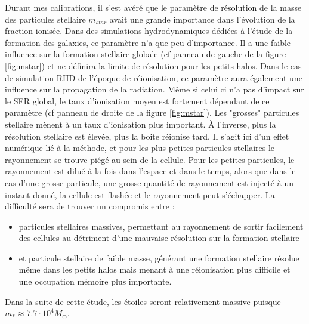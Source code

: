 Durant mes calibrations, il s'est avéré que le paramètre de résolution de la masse des particules stellaire $m_{star}$ avait une grande importance dans l'évolution de la fraction ionisée.
Dans des simulations hydrodynamiques dédiées à l'étude de la formation des galaxies, ce paramètre n'a que peu d'importance.
Il a une faible influence sur la formation stellaire globale (cf panneau de gauche de la figure \ref{fig:mstar}) et ne définira la limite de résolution pour les petits halos.
Dans le cas de simulation \ac{RHD} de l'époque de réionisation, ce paramètre aura également une influence sur la propagation de la radiation.
Même si celui ci n'a pas d'impact sur le \ac{SFR} global, le taux d'ionisation moyen est fortement dépendant de ce paramètre (cf panneau de droite de la figure \ref{fig:mstar}).
Les "grosses" particules stellaire mènent à un taux d'ionisation plus important.
À l'inverse, plus la résolution stellaire est élevée, plus la boite réionise tard.
Il s'agit ici d'un effet numérique lié à la méthode, et pour les plus petites particules stellaires le rayonnement se trouve piégé au sein de la cellule.
Pour les petites particules, le rayonnement est dilué à la fois dans l'espace et dans le temps, alors que dans le cas d'une grosse particule, une grosse quantité de rayonnement est injecté à un instant donné, la cellule est flashée et le rayonnement peut s'échapper.
La difficulté sera de trouver un compromis entre :

\begin{itemize}
\item particules stellaires massives, permettant au rayonnement de sortir facilement des cellules au détriment d'une mauvaise résolution sur la formation stellaire
\item  et particule stellaire de faible masse, générant une formation stellaire résolue même dans les petits halos mais menant à une réionisation plus difficile et une occupation mémoire plus importante.
\end{itemize}

Dans la suite de cette étude, les étoiles seront relativement massive puisque $m_* \approx 7.7 \cdot 10^4 M_\odot$.


